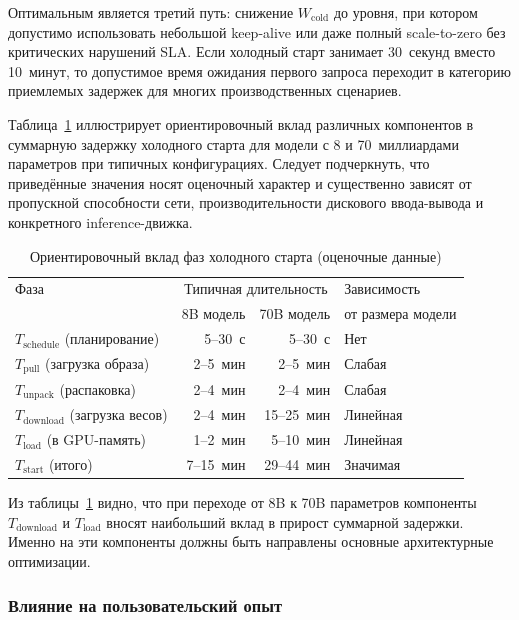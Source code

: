 Оптимальным является третий путь: снижение $W_{\mathrm{cold}}$ до уровня, при котором допустимо использовать небольшой keep-alive или даже полный scale-to-zero без критических нарушений SLA. Если холодный старт занимает 30~секунд вместо 10~минут, то допустимое время ожидания первого запроса переходит в категорию приемлемых задержек для многих производственных сценариев.

Таблица~\ref{tab:cold_start_components} иллюстрирует ориентировочный вклад различных компонентов в суммарную задержку холодного старта для модели с 8 и 70~миллиардами параметров при типичных конфигурациях. Следует подчеркнуть, что приведённые значения носят оценочный характер и существенно зависят от пропускной способности сети, производительности дискового ввода-вывода и конкретного inference-движка.

\begin{table}[htbp]
\centering
\caption{Ориентировочный вклад фаз холодного старта (оценочные данные)}
\label{tab:cold_start_components}
\begin{tabular}{lrrl}
\toprule
Фаза & \multicolumn{2}{c}{Типичная длительность} & Зависимость \\
     & 8B модель & 70B модель & от размера модели \\
\midrule
$T_{\mathrm{schedule}}$ (планирование) & 5--30~с   & 5--30~с   & Нет \\
$T_{\mathrm{pull}}$ (загрузка образа)  & 2--5~мин  & 2--5~мин  & Слабая \\
$T_{\mathrm{unpack}}$ (распаковка)     & 2--4~мин  & 2--4~мин  & Слабая \\
$T_{\mathrm{download}}$ (загрузка весов) & 2--4~мин & 15--25~мин & Линейная \\
$T_{\mathrm{load}}$ (в GPU-память)     & 1--2~мин  & 5--10~мин & Линейная \\
\midrule
$T_{\mathrm{start}}$ (итого)           & 7--15~мин & 29--44~мин & Значимая \\
\bottomrule
\end{tabular}
\end{table}

Из таблицы~\ref{tab:cold_start_components} видно, что при переходе от 8B к 70B параметров компоненты $T_{\mathrm{download}}$ и $T_{\mathrm{load}}$ вносят наибольший вклад в прирост суммарной задержки. Именно на эти компоненты должны быть направлены основные архитектурные оптимизации.

\subsubsection{Влияние на пользовательский опыт}

